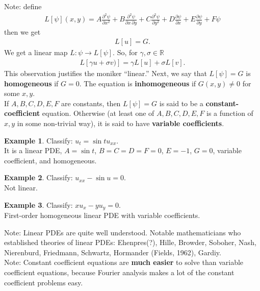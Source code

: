 \documentclass{book}
\theoremstyle{definition}
\newtheorem{exmp}{Example}[section]
\begin{document}

Note: define
\begin{align*}
L[\psi](x,y) = A\frac{\partial^2 \psi}{\partial x^2} + B\frac{\partial^2 \psi}{\partial x\,\partial y} + C\frac{\partial^2 \psi}{\partial y^2} + D\frac{\partial \psi}{\partial x} + E\frac{\partial \psi}{\partial y} + F\psi
\end{align*}
then we get
\begin{align*}
L[u] = G.
\end{align*}
We get a linear map $L:\psi\rightarrow L[\psi]$. So, for $\gamma, \sigma \in \mathbb{R}$
\begin{align*}
L[\gamma u+ \sigma v)] = \gamma L[u] + \sigma L[v].
\end{align*}
This observation justifies the moniker ``linear.'' Next, we say that $L[\psi] = G$ is \textbf{homogeneous} if $G = 0$. The equation is \textbf{inhomogeneous} if $G(x,y)\neq 0$ for some $x,y$.\\

If $A,B,C,D,E,F$ are constants, then $L[\psi] = G$ is said to be a \textbf{constant-coefficient} equation. Otherwise (at least one of $A,B,C,D,E,F$ is a function of $x,y$ in some non-trivial way), it is said to have \textbf{variable coefficients}. 

\begin{exmp}
	Classify: $u_t = \sin t u_{xx}$.\\
	
	It is a linear PDE, $A = \sin t$, $B=C=D=F=0$, $E=-1$, $G=0$, variable coefficient, and homogeneous. 
\end{exmp}
\begin{exmp}
	Classify: $u_{xx} -\sin u = 0$.\\
	
	Not linear.
\end{exmp}

\begin{exmp}
	Classify: $xu_x - yu_y = 0$.\\
	
	First-order homogeneous linear PDE with variable coefficients. 
\end{exmp}

Note: Linear PDEs are quite well understood. Notable mathematicians who established theories of linear PDEs: Ehenpres(?), Hille, Browder, Soboher, Nash, Nierenburd, Friedmann, Schwartz, Hormander (Fields, 1962), Gardiy.\\

Note: Constant coefficient equations are \textbf{much easier} to solve than variable coefficient equations, because Fourier analysis makes a lot of the constant coefficient problems easy.\\
\end{document}
